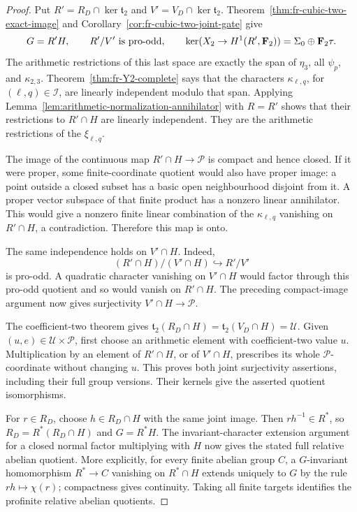 \begin{proof}
Put \(R'=R_D\cap\ker\mathfrak t_2\) and
\(V'=V_D\cap\ker\mathfrak t_2\). Theorem~\ref{thm:fr-cubic-two-exact-image}
and Corollary~\ref{cor:fr-cubic-two-joint-gate} give
\[
 G=R'H,\qquad R'/V'\text{ is pro-odd},\qquad
 \ker(X_2\to H^1(R',\mathbf F_2))=\Sigma_0\oplus\mathbf F_2\tau.
\]
The arithmetic restrictions of this last space are exactly the span
of \(\eta_3\), all \(\psi_p\), and \(\kappa_{2,3}\).
Theorem~\ref{thm:fr-Y2-complete} says that the characters
\(\kappa_{\ell,q}\), for \((\ell,q)\in\mathcal I\), are linearly
independent modulo that span. Applying
Lemma~\ref{lem:arithmetic-normalization-annihilator} with \(R=R'\)
shows that their restrictions to \(R'\cap H\) are linearly independent.
They are the arithmetic restrictions of the \(\xi_{\ell,q}\).

The image of the continuous map
\(R'\cap H\to\mathcal P\) is compact and hence closed. If it
were proper, some finite-coordinate quotient would also have proper
image: a point outside a closed subset has a basic open neighbourhood
disjoint from it. A proper vector subspace of that finite product
has a nonzero linear annihilator. This would give a nonzero finite
linear combination of the \(\kappa_{\ell,q}\) vanishing on
\(R'\cap H\), a contradiction. Therefore this map is onto.

The same independence holds on \(V'\cap H\). Indeed,
\[
 (R'\cap H)/(V'\cap H)\hookrightarrow R'/V'
\]
is pro-odd. A quadratic character vanishing on \(V'\cap H\)
would factor through this pro-odd quotient and so would vanish on
\(R'\cap H\). The preceding compact-image argument now gives
surjectivity \(V'\cap H\to\mathcal P\).

The coefficient-two theorem gives
\(\mathfrak t_2(R_D\cap H)=\mathfrak t_2(V_D\cap H)=\mathcal U\).
Given \((u,e)\in\mathcal U\times\mathcal P\), first choose an
arithmetic element with coefficient-two value \(u\). Multiplication
by an element of \(R'\cap H\), or of \(V'\cap H\), prescribes
its whole \(\mathcal P\)-coordinate without changing \(u\).
This proves both joint surjectivity assertions, including their full
group versions. Their kernels give the asserted quotient isomorphisms.

For \(r\in R_D\), choose \(h\in R_D\cap H\) with the same joint
image. Then \(rh^{-1}\in R^*\), so
\(R_D=R^*(R_D\cap H)\) and \(G=R^*H\).
The invariant-character extension argument for a closed normal
factor multiplying with \(H\) now gives the stated full relative
abelian quotient. More explicitly, for every finite abelian group
\(C\), a \(G\)-invariant homomorphism \(R^*\to C\) vanishing
on \(R^*\cap H\) extends uniquely to \(G\) by the rule
\(rh\mapsto\chi(r)\); compactness gives continuity. Taking all
finite targets identifies the profinite relative abelian quotients.


\end{proof}
